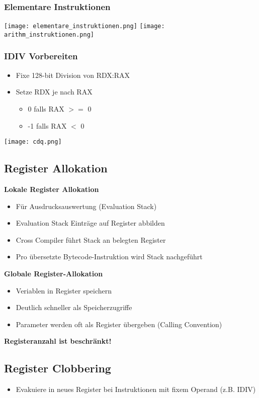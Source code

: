 \subsubsection{Elementare Instruktionen}
\texttt{[image: elementare\_instruktionen.png]}
\texttt{[image: arithm\_instruktionen.png]}

\subsubsection{IDIV Vorbereiten}
\begin{itemize}
    \item Fixe 128-bit Division von RDX:RAX
    \item Setze RDX je nach RAX
    \begin{itemize}
        \item 0 falls RAX $>=$ 0
        \item -1 falls RAX $<$ 0
    \end{itemize}
\end{itemize}
\texttt{[image: cdq.png]}

\subsection{Register Allokation}
\textbf{Lokale Register Allokation}
\begin{itemize}
    \item Für Ausdrucksauswertung (Evaluation Stack)
    \item Evaluation Stack Einträge auf Register abbilden
    \item Cross Compiler führt Stack an belegten Register 
    \item Pro übersetzte Bytecode-Instruktion wird Stack nachgeführt
\end{itemize}
\textbf{Globale Register-Allokation}
\begin{itemize}
    \item Veriablen in Register speichern
    \item Deutlich schneller als Speicherzugriffe
    \item Parameter werden oft als Register übergeben (Calling Convention)
\end{itemize}
\textbf{Registeranzahl ist beschränkt!}

\subsection{Register Clobbering}
\begin{itemize}
    \item Evakuiere in neues Register bei Instruktionen mit fixem Operand (z.B. IDIV)
\end{itemize}
